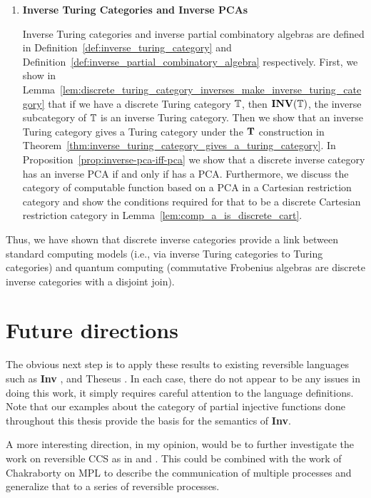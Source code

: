 \begin{enumerate}
\item \textbf{Inverse Turing Categories and Inverse PCAs}

Inverse Turing categories and inverse partial combinatory algebras are defined in
Definition~\ref{def:inverse_turing_category} and
Definition~\ref{def:inverse_partial_combinatory_algebra} respectively. First, we show in
Lemma~\ref{lem:discrete_turing_category_inverses_make_inverse_turing_category} that if we have a
discrete Turing category $\mathbb{T}$, then $\mathbf{INV}({\mathbb{T}})$, the inverse subcategory of $\mathbb{T}$ is an inverse Turing
category. Then we show that an inverse Turing category gives a Turing category under the $\mathbf{T}$
construction in Theorem~\ref{thm:inverse_turing_category_gives_a_turing_category}. In
Proposition~\ref{prop:inverse-pca-iff-pca} we show that a discrete inverse category \X has an
inverse PCA if and only if \Xt has a PCA. Furthermore, we discuss the category of computable
function based on a PCA in a Cartesian restriction category and show the conditions required for
that to be a discrete Cartesian restriction category in Lemma~\ref{lem:comp_a_is_discrete_cart}.
\end{enumerate}

Thus, we have shown that discrete inverse categories provide a link between standard computing
models (i.e., via inverse Turing categories to Turing categories) and quantum computing (commutative
Frobenius algebras are discrete inverse categories with a disjoint join).

\section{Future directions}
\label{sec:whither-next}

The obvious next step is to apply these results to existing reversible languages such as
\textbf{Inv} \cite{muetal04:injreversible}, and Theseus
\cite{james2013isomorphic,james2012information}. In each case, there do not appear to be any issues
in doing this work, it simply requires careful attention to the language definitions. Note that our
examples about the category of partial injective functions done throughout this thesis provide the
basis for the semantics of \textbf{Inv}.

A more interesting direction, in my opinion, would be to further investigate the work on reversible
CCS as in \cite{danos2004reversible} and \cite{phillips2006operational}. This could be combined with
the work of Chakraborty on MPL \cite{chakraborty2014} to describe the communication of multiple
processes and generalize that to a series of reversible processes.

